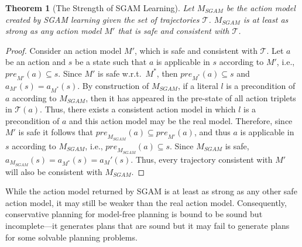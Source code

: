 \documentclass{article}
\newtheorem{theorem}{Theorem}
\newcommand{\pre}{\textit{pre}}
\newcommand{\realm}{\ensuremath{M^*}\xspace}
\newcommand{\sgam}{\textit{SGAM}\xspace}
\begin{document}
\begin{theorem}[The Strength of SGAM Learning]
Let $M_{SGAM}$ be the action model created by SGAM learning given the set of trajectories $\mathcal{T}$. 
$M_{SGAM}$ is at least as strong as any action model $M'$ that is safe and consistent with $\mathcal{T}$. %
\label{thm:sam-learning-complete-grounded}
\end{theorem}
\begin{proof}
Consider an action model $M'$, which is safe and consistent with $\mathcal{T}$. %
Let $a$ be an action and $s$ be a state such that $a$ is applicable in $s$ according to $M'$, i.e., $\pre_{M'}(a)\subseteq s$. 
Since $M'$ is safe w.r.t.\ \realm, then 
$\pre_{\realm}(a)\subseteq s$
and $a_{M'}(s)=a_{\realm}(s)$. 
By construction of $M_\sgam$, if a literal $l$ is a precondition of $a$ according to $M_\sgam$, 
then it has appeared in the pre-state of all action triplets in $\mathcal{T}(a)$. 
Thus, there exists a consistent action model in which $l$ is a precondition of $a$ 
and this action model may be the real model. 
Therefore, since $M'$ is safe it follows that $\pre_{M_\sgam}(a)\subseteq \pre_{M'}(a)$, 
and thus $a$ is applicable in $s$ according to $M_\sgam$, 
i.e., $\pre_{M_\sgam}(a)\subseteq s$. 
Since $M_\sgam$ is safe, %
$a_{M_\sgam}(s)=a_{\realm}(s)=a_M'(s)$.%
Thus, every trajectory consistent with  $M'$ will also be consistent with $M_\sgam$.
\end{proof}

While the action model returned by SGAM is at least as strong as any other safe action model, it may still be weaker than the real action model. Consequently, conservative planning for model-free planning is bound to be sound but incomplete---it generates plans that are sound but it may fail to generate plans for some solvable planning problems. 
\end{document}
